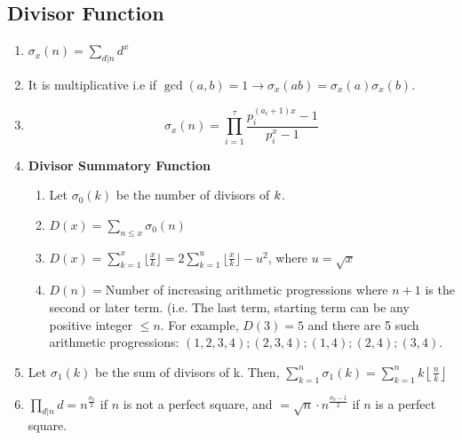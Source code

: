 \subsection{Divisor Function}
\begin{enumerate}[resume]
    \item $\displaystyle \sigma_x(n)=\sum\limits_{d\vert n}^{}d^x$
    \item It is multiplicative i.e if $\displaystyle \gcd(a, b)=1\to \sigma_x(ab)=\sigma_x(a)\sigma_x(b)$.
    \item \[\displaystyle \sigma_x(n)=\prod\limits_{i=1}^{\tau}\frac{p_i^{(a_i+1)x}-1}{p_i^x-1}\]
    \item \textbf{Divisor Summatory Function}
    \begin{enumerate}
        \item Let $\displaystyle \sigma_0(k)$ be the number of divisors of $\displaystyle \displaystyle k$.
        \item $D(x)=\sum\limits_{n\leq{x}}{\sigma_0(n)}$
        \item $D(x)=\sum\limits_{k=1}^{x}\lfloor\frac{x}{k}\rfloor=2\sum\limits_{k=1}^{u}\lfloor\frac{x}{k}\rfloor-u^2$, where $u=\sqrt{x}$
        \item $D(n)=$Number of increasing arithmetic progressions where $n+1$ is the second or later term. (i.e. The last term, starting term can be any positive integer $\displaystyle \le n$. For example, $D(3)=5$ and there are 5 such arithmetic progressions: $\displaystyle (1, 2, 3, 4); (2, 3, 4); (1, 4); (2, 4); (3, 4).$
    \end{enumerate}
    \item Let $\displaystyle \sigma_1(k)$ be the sum of divisors of k. Then, $\displaystyle \sum\limits_{k=1}^{n}\sigma_1(k)=\sum\limits_{k=1}^{n}{k \left\lfloor \frac{n}{k} \right\rfloor}$
    \item $\displaystyle \prod\limits_{d\vert n}^{}d={n^{\frac{\sigma_0}{2}}}$ if $n$ is not a perfect square, and $=\sqrt{n} \cdot n^{\frac{\sigma_0-1}{2}}$ if $n $ is a perfect square.
\end{enumerate}
